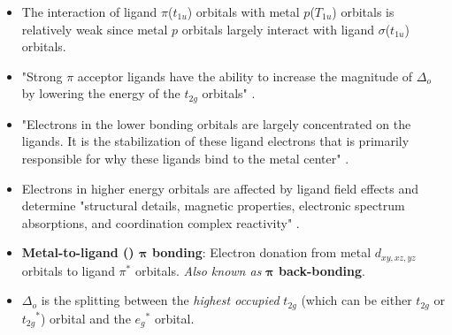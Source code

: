 \documentclass[../notes.tex]{subfiles}
\begin{document}
\begin{itemize}
    \item The interaction of ligand $\pi$($t_{1u}$) orbitals with metal $p$($T_{1u}$) orbitals is relatively weak since metal $p$ orbitals largely interact with ligand $\sigma$($t_{1u}$) orbitals.
    \item "Strong $\pi$ acceptor ligands have the ability to increase the magnitude of $\Delta_o$ by lowering the energy of the $t_{2g}$ orbitals" \parencite[368]{bib:MiesslerFischerTarr}.
    \item "Electrons in the lower bonding orbitals are largely concentrated on the ligands. It is the stabilization of these ligand electrons that is primarily responsible for why these ligands bind to the metal center" \parencite[368]{bib:MiesslerFischerTarr}.
    \item Electrons in higher energy orbitals are affected by ligand field effects and determine "structural details, magnetic properties, electronic spectrum absorptions, and coordination complex reactivity" \parencite[368]{bib:MiesslerFischerTarr}.
    \item \textbf{Metal-to-ligand () $\bm{\pi}$ bonding}: Electron donation from metal $d_{xy,xz,yz}$ orbitals to ligand $\pi^*$ orbitals. \emph{Also known as} \textbf{$\bm{\pi}$ back-bonding}.
    \item $\Delta_o$ is the splitting between the \emph{highest occupied} $t_{2g}$ (which can be either $t_{2g}$ or ${t_{2g}}^*$) orbital and the ${e_g}^*$ orbital.
    \begin{figure}[h!]
        \centering
\end{figure}
\end{itemize}
\end{document}

